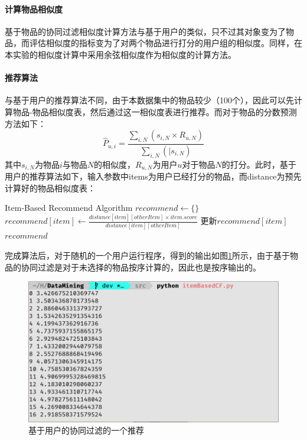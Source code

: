 \documentclass{article}
\begin{document}
\paragraph{计算物品相似度}
\label{par:ji_suan_wu_pin_xiang_si_du_}
\par 基于物品的协同过滤相似度计算方法与基于用户的类似，只不过其对象变为了物品，而评估相似度的指标变为了对两个物品进行打分的用户组的相似度。同样，在本实验的相似度计算中采用余弦相似度作为相似度的计算方法。

\paragraph{推荐算法}
\label{par:tui_jian_suan_fa_2}

\par 与基于用户的推荐算法不同，由于本数据集中的物品较少（100个），因此可以先计算物品-物品相似度表，然后通过这一相似度表进行推荐。而对于物品的分数预测方法如下：
\[\hat{P}_{u,i} = \frac{\sum_{i, N}(s_{i,N}\times R_{u, N})}{\sum_{i, N}(|s_{i,N})}\]
其中\(s_{i,N}\)为物品\(i\)与物品\(N\)的相似度，\(R_{u,N}\)为用户\(u\)对于物品\(N\)的打分。此时，基于用户的推荐算法如下，输入参数中items为用户已经打分的物品，而distance为预先计算好的物品相似度表：
\begin{simpleAlgorithm}{Item-Based Recommend Algorithm}
    \State \(recommend \leftarrow \{\}\)
                \State \(recommend[item] \leftarrow \frac{distance[item][otherItem]\times item.score}{distance[item][otherItem]}\)
            \Else
                \State 更新\(recommend[item]\)
            \EndIf
        \EndFor
    \EndFor
    \State \Return \(recommend\)
    \EndProcedure
\end{simpleAlgorithm}
\par 完成算法后，对于随机的一个用户运行程序，得到的输出如图\ref{fig:itemOutput}所示，由于基于物品的协同过滤是对于未选择的物品按序计算的，因此也是按序输出的。
\begin{figure}[htpb]
    \centering
    \includegraphics[width=0.9\linewidth]{itemOutput.png}
    \caption{基于用户的协同过滤的一个推荐}
    \label{fig:itemOutput}
\end{figure}
\end{document}
